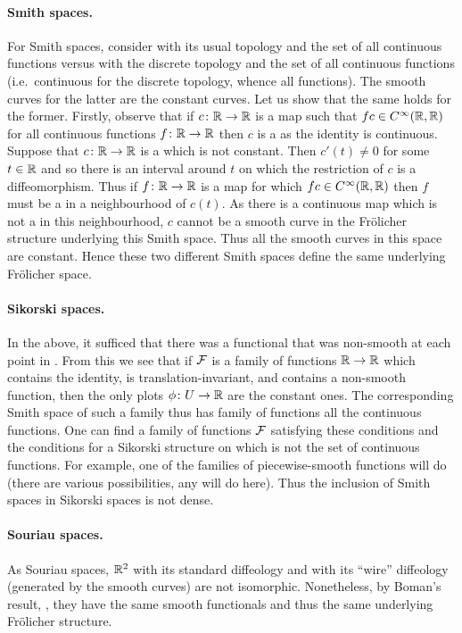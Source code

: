 \documentclass[%
12pt,%
arxiv,%
defaults
]{myclass}
\begin{document}
\paragraph{Smith spaces.}
For Smith spaces, consider \R with its usual topology and the set of all continuous functions versus \R with the discrete topology and the set of all continuous functions (i.e.\ continuous for the discrete topology, whence all functions).
The smooth curves for the latter are the constant curves.
Let us show that the same holds for the former.
Firstly, observe that if \(c \colon \mathbb{R} \to \mathbb{R}\) is a map such that \(f c \in C^\infty(\mathbb{R},\mathbb{R})\) for all continuous functions \(f \colon \mathbb{R} \to \mathbb{R}\) then \(c\) is a \cimap as the identity is continuous.
Suppose that \(c \colon \mathbb{R} \to \mathbb{R}\) is a \cimap which is not constant.
Then \(c'(t) \ne 0\) for some \(t \in \mathbb{R}\) and so there is an interval around \(t\) on which the restriction of \(c\) is a diffeomorphism.
Thus if \(f \colon \mathbb{R} \to \mathbb{R}\) is a map for which \(f c \in C^\infty(\mathbb{R},\mathbb{R})\) then \(f\) must be a \cimap in a neighbourhood of \(c(t)\).
As there is a continuous map which is not a \cimap in this neighbourhood, \(c\) cannot be a smooth curve in the Fr\"olicher structure underlying this Smith space.
Thus all the smooth curves in this space are constant.
Hence these two different Smith spaces define the same underlying Fr\"olicher space.

\paragraph{Sikorski spaces.}
In the above, it sufficed that there was a functional that was non\hyp{}smooth at each point in \R.
From this we see that if \(\mathcal{F}\) is a family of functions \(\mathbb{R} \to \mathbb{R}\) which contains the identity, is translation\hyp{}invariant, and contains a non\hyp{}smooth function, then the only plots \(\phi \colon U \to \mathbb{R}\) are the constant ones.
The corresponding Smith space of such a family thus has family of functions all the continuous functions.
One can find a family of functions \(\mathcal{F}\) satisfying these conditions and the conditions for a Sikorski structure on \R which is not the set of continuous functions.
For example, one of the families of piecewise\hyp{}smooth functions will do (there are various possibilities, any will do here).
Thus the inclusion of Smith spaces in Sikorski spaces is not dense.

\paragraph{Souriau spaces.}
As Souriau spaces, \(\mathbb{R}^2\) with its standard diffeology and with its ``wire'' diffeology (generated by the smooth curves) are not isomorphic.
Nonetheless, by Boman's result, \cite{jb3}, they have the same smooth functionals and thus the same underlying Fr\"olicher structure.
\end{document}
